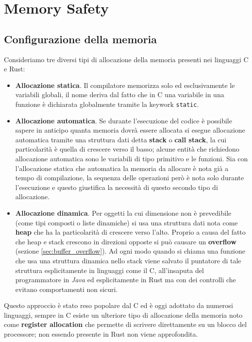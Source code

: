 \documentclass{report}
\begin{document}
\chapter{Memory Safety} \label{chap:memory_safety}

\section{Configurazione della memoria}
Consideriamo tre diversi tipi di allocazione della memoria presenti nei linguaggi C e Rust:
\begin{itemize}
    \item \textbf{Allocazione statica}. Il compilatore memorizza solo ed esclusivamente le variabili globali, il nome deriva dal fatto che in C una variabile in una funzione è dichiarata globalmente tramite la keywork \colorbox{backcolour}{\texttt{static}}.
    
    \item \textbf{Allocazione automatica}. Se durante l'esecuzione del codice è possibile sapere in anticipo quanta memoria dovrà  essere allocata si esegue allocazione automatica tramite una struttura dati detta \textbf{stack} o \textbf{call stack}, la cui particolarità è quella di crescere verso il basso; alcune entità che richiedono allocazione automatica sono le variabili di tipo primitivo e le funzioni. Sia con l'allocazione statica che automatica la memoria da allocare è nota già a tempo di compilazione, la sequenza delle operazioni però è nota solo durante l'esecuzione e questo giustifica la necessità di questo secondo tipo di allocazione. 
    
    \item \textbf{Allocazione dinamica}. Per oggetti la cui dimensione non è prevedibile (come tipi composti o liste dinamiche) si usa una struttura dati nota come \textbf{heap} che ha la particolarità di crescere verso l'alto. Proprio a causa del fatto che heap e stack crescono in direzioni opposte si può causare un \textbf{overflow} (sezione \ref{sec:buffer_overflow}). Ad ogni modo quando si chiama una funzione che usa una struttura dinamica nello stack viene salvato il puntatore di tale struttura esplicitamente in linguaggi come il C, all'insaputa del programmatore in \textit{Java} ed esplicitamente in Rust ma con dei controlli che evitano comportamenti non sicuri.  
\end{itemize}

Questo approccio è stato reso popolare dal C ed è oggi adottato da numerosi linguaggi, sempre in C esiste un ulteriore tipo di allocazione della memoria noto come \textbf{register allocation} che permette di scrivere direttamente su un blocco del processore; non essendo presente in Rust non viene approfondita. \\
\end{document}
